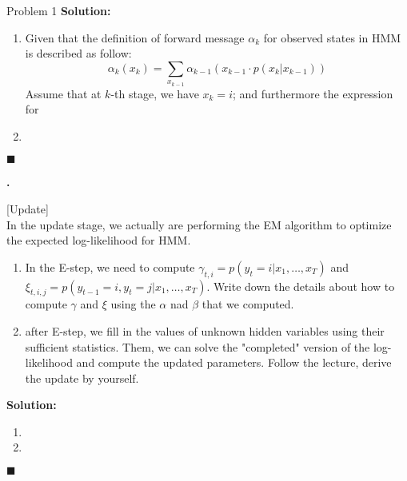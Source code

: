 \documentclass{article}
\newcounter{pcounter}                                   %
\newenvironment{problem}                                %
{                                                       %
    \color{gray}                                        %
    \stepcounter{pcounter}                              %
    \textbf{\arabic{pcounter}.}                         %
}{}                                                     %
\newenvironment{solution}                               %
{\textbf{Solution:} }{$\blacksquare$}                   %
\begin{document}
\begin{section}{Problem 1}
        \begin{solution}
            \begin{enumerate}[label=\alph*)]
                \item %
                Given that the definition of forward message $\alpha_k$ for observed states in HMM is described as follow:
                $$
                \alpha_k(x_k) = \sum_{x_{k-1}} \alpha_{k-1}(x_{k-1} \cdot p(x_k|x_{k-1}))
                $$
                Assume that at $k$-th stage, we have $x_k=i$; and furthermore the expression for 

                \item %
                
            \end{enumerate}
        \end{solution}

        \begin{problem}
            [Update] \\
            In the update stage, we actually are performing the EM algorithm to optimize the expected log-likelihood for HMM.
            \begin{enumerate}[label=\alph*)]
                \item In the E-step, we need to compute $\gamma_{t,i}=p(y_t=i|x_1, \dots, x_T)$ and $\xi_{t,i,j} = p(y_{t-1}=i, y_{t}=j|x_1, \dots, x_T)$.
                Write down the details about how to compute $\gamma$ and $\xi$ using the $\alpha$ nad $\beta$ that we computed.

                \item after E-step, we fill in the values of unknown hidden variables using their sufficient statistics. Them, we can solve the "completed" version of the log-likelihood and compute the updated parameters. Follow the lecture, derive the update by yourself.
            \end{enumerate}
        \end{problem}

        \begin{solution}
            \begin{enumerate}[label=\alph*)]
                \item %
                
                \item %
                
            \end{enumerate}
        \end{solution}
        

\end{section}
\end{document}
